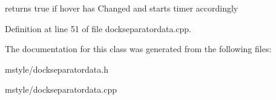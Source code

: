 returns true if hover has Changed and starts timer accordingly 

Definition at line 51 of file dockseparatordata.\+cpp.



The documentation for this class was generated from the following files\+:\begin{DoxyCompactItemize}
\item 
mstyle/dockseparatordata.\+h\item 
mstyle/dockseparatordata.\+cpp\end{DoxyCompactItemize}
